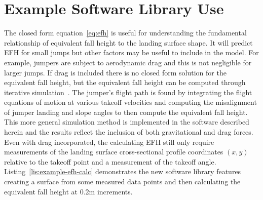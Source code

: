 \documentclass[smallextended]{svjour3}       %
\begin{document}
\section{Example Software Library Use}
\label{sec:example}
%
The closed form equation~\ref{eq:efh} is useful for understanding the
fundamental relationship of equivalent fall height to the landing surface shape. It
will predict EFH for small jumps but other factors may be useful to
include in the model. For example, jumpers are subject to aerodynamic drag and
this is not negligible for larger jumps. If drag is included there is no closed
form solution for the equivalent fall height, but the equivalent fall height
can be computed through iterative simulation~\cite{Levy2015}. The jumper's
flight path is found by integrating the flight equations of motion at various
takeoff velocities and computing the misalignment of jumper landing and slope 
angles to then compute the equivalent fall height. This more general
simulation method is implemented in the software described herein and the
results reflect the inclusion of both gravitational and drag forces. Even with
drag incorporated, the calculating EFH still only require measurements of the
landing surface cross-sectional profile coordinates $(x,y)$ relative to the
takeoff point and a measurement of the takeoff angle.
Listing~\ref{lis:example-efh-calc} demonstrates the new software library
features creating a surface from some measured data points and then
calculating the equivalent fall height at 0.2\si{\meter} increments.
%
\end{document}
